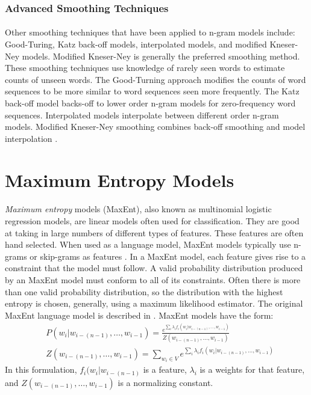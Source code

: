 \subsubsection{Advanced Smoothing Techniques}
\paragraph{}
 Other smoothing techniques that have been applied to n-gram models include: Good-Turing, Katz back-off models, interpolated models, and modified Kneser-Ney models. Modified Kneser-Ney is generally the preferred smoothing method. These smoothing techniques use knowledge of rarely seen words to estimate counts of unseen words. The Good-Turning approach modifies the counts of word sequences to be more similar to word sequences seen more frequently. The Katz back-off model backs-off to lower order n-gram models for zero-frequency word sequences. Interpolated models interpolate between different order n-gram models. Modified Kneser-Ney smoothing combines back-off smoothing and model interpolation \cite{Jurafsky2009}.

\section{Maximum Entropy  Models}
\paragraph{}
\emph{Maximum entropy} models (MaxEnt), also known as multinomial logistic regression models, are linear models often used for classification. They are good at taking in large numbers of different types of features. These features are often hand selected. When used as a language model, MaxEnt models typically use n-grams or skip-grams as features \cite{Mikolov2012}. In a MaxEnt model, each feature gives rise to a constraint that the model must follow. A valid probability distribution produced by an MaxEnt model must conform to all of its constraints. Often there is more than one valid probability distribution, so the distribution with the highest entropy is chosen, generally, using a maximum likelihood estimator. The original MaxEnt language model is described in \cite{Rosenfeld1994}.
MaxEnt models have the form:
\begin{align}
&P(w_i | w_{i-(n-1)},\dots, w_{i-1}) = \frac{e^{\sum_i \lambda_i f_i(w_i | w_{i-(n-1)},\dots, w_{i-1})}}{Z(w_{i-(n-1)},
\dots, w_{i-1})} \label{eq:maxent}
\\
&Z(w_{i-(n-1)},\dots, w_{i-1}) = \sum_{w_i \in V} e^{\sum_i \lambda_i f_i(w_i | w_{i-(n-1)},\dots, w_{i-1})} \nonumber
\end{align}
In this formulation, $f_i(w_i | w_{i-(n-1)}$ is a feature, $\lambda_i$ is a weights for that feature, and $Z(w_{i-(n-1)},\dots, w_{i-1})$ is a normalizing constant.
